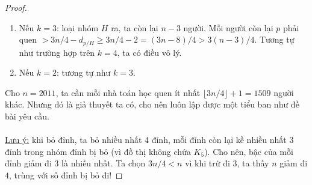 \documentclass{treatise}
\begin{document}
\begin{proof}
\begin{enumerate}
	\item Nếu $k = 3$: loại nhóm $H$ ra, ta còn lại $n - 3$ người. Mỗi người còn lại $p$ phải quen $> 3n/4 - d_{p/H} \geq 3n/4 - 2 = (3n - 8)/4 > 3(n-3)/4$. Tương tự như trường hợp trên $k = 4$, ta có điều vô lý.
	\item Nếu $k = 2$: tương tự như $k = 3$.
\end{enumerate}
Cho $n = 2011$, ta cần mỗi nhà toán học quen ít nhất $\lfloor 3n/4 \rfloor + 1 = 1509$ người khác. Nhưng đó là giả thuyết ta có, cho nên luôn lập được một tiểu ban như đề bài yêu cầu.
\\
\\
\underline{Lưu ý:} khi bỏ đỉnh, ta bỏ nhiều nhất 4 đỉnh, mỗi đỉnh còn lại kề nhiều nhất 3 đỉnh trong nhóm đỉnh bị bỏ (vì đồ thị không chứa $K_5$). Cho nên, bậc của mỗi đỉnh giảm đi 3 là nhiều nhất. Ta chọn $3n/4 < n$ vì khi trừ đi $3$, ta thấy $n$ giảm đi $4$, trùng với số đỉnh bị bỏ đi!
\end{proof}

\newpage
\end{document}
